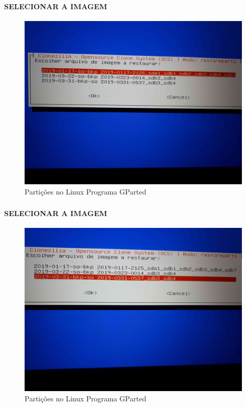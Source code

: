 \documentclass{beamer}
\begin{document}
\begin{frame}[plain,c]
   \frametitle{\insertsection}
    \framesubtitle{SELECIONAR A IMAGEM}
    \begin{figure}[!h]
        \includegraphics[width=1\linewidth]{images/rest/res6.jpg}
        \caption{Partições no Linux Programa GParted}
    \end{figure}
\end{frame}	


\begin{frame}[plain,c]
   \frametitle{\insertsection}
    \framesubtitle{SELECIONAR A IMAGEM}
    \begin{figure}[!h]
        \includegraphics[width=1\linewidth]{images/rest/res7.jpg}
        \caption{Partições no Linux Programa GParted}
    \end{figure}
\end{frame}	
\end{document}
